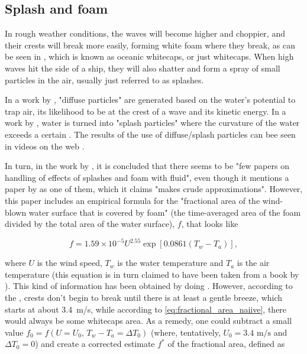 \subsection{Splash and foam}

In rough weather conditions, the waves will become higher and choppier, and their crests will break more easily, forming white foam where they break, as can be seen in , which is known as oceanic whitecaps, or just whitecaps. When high waves hit the side of a ship, they will also shatter and form a spray of small particles in the air, usually just referred to as splashes.

In a work by \citet{Ihmsen2012}, "diffuse particles" are generated based on the water's potential to trap air, its likelihood to be at the crest of a wave and its kinetic energy. In a work by \citet{Takahashi2003}, water is turned into "splash particles" where the curvature of the water exceeds a certain \threshold. The results of the use of diffuse/splash particles can bee seen in videos on the web \citep{Chandel2009,RealFlowLabs2011,Ihmsen2012}.

In turn, in the work by \citet{Takahashi2003}, it is concluded that there seems to be "few papers on handling of effects of splashes and foam with fluid", even though it mentions a paper by \citet{Premovze2001} as one of them, which it claims "makes crude approximations". However, this paper includes an empirical formula for the "fractional area of the wind-blown water surface that is covered by foam" (the time-averaged area of the foam divided by the total area of the water surface), $f$, that looks like

\begin{equation} \label{eq:fractional_area_naiive}
f = 1.59 \times 10^{-5}U^{2.55}\exp[0.0861(T_w - T_a)],
\end{equation}

where $U$ is the wind speed, $T_w$ is the water temperature and $T_a$ is the air temperature (this equation is in turn claimed to have been taken from a book by \citet{Monahan1986}). This kind of information has been obtained by doing . However, according to the , crests don't begin to break until there is at least a gentle breeze, which starts at about \mbox{3.4 m/s}, while according to \eqref{eq:fractional_area_naiive}, there would always be some whitecaps area. As a remedy, one could subtract a small value ${f_0 = f(U=U_0,\, T_w-T_a=\Delta T_0)}$ (where, tentatively, ${U_0 = 3.4\text{ m/s}}$ and ${\Delta T_0 = 0}$) and create a corrected estimate $f^*$ of the fractional area, defined as

